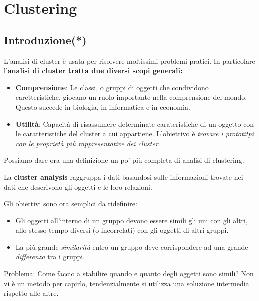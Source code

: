 \pagestyle{fancy}
\cfoot{\thepage}
\renewcommand{\footrulewidth}{0.25pt}


 
\section{Clustering}
\subsection{Introduzione(*)}

L'analisi di cluster è usata per risolvere moltissimi problemi pratici. In particolare l'\textbf{analisi di cluster tratta due diversi scopi generali:}

\begin{itemize}
	\item \textbf{Comprensione}: Le classi, o gruppi di oggetti che condividono caretteristiche, giocano un ruolo importante nella comprensione del mondo. Questo succede in biologia, in informatica e in economia.
	\item \textbf{Utilità}: Capacità di risassumere determinate carateristiche di un oggetto con le caratteristiche del cluster a cui appartiene. L'obiettivo è \textit{trovare i prototitpi con le proprietà più rappresentative dei cluster}.
\end{itemize}

Possiamo dare ora una definizione un po' più completa di analisi di clustering.
\begin{defn}
	La \textbf{cluster analysis} raggruppa i dati basandosi sulle informazioni trovate nei dati che descrivono gli oggetti e le loro relazioni.
\end{defn}

Gli obiettivi sono ora semplici da ridefinire:
\begin{itemize}
	\item Gli oggetti all'interno di un gruppo devono essere simili gli uni con gli altri, allo stesso tempo diversi (o incorrelati) con gli oggetti di altri gruppi.
	\item La più grande \textit{similarità} entro un gruppo deve corrispondere ad una grande \textit{differenza} tra i gruppi. 
\end{itemize}

\underline{Problema}: Come faccio a stabilire quando  e quanto degli oggetti sono simili? Non vi è un metodo per capirlo, tendenzialmente si utilizza una soluzione intermedia rispetto alle altre. 

